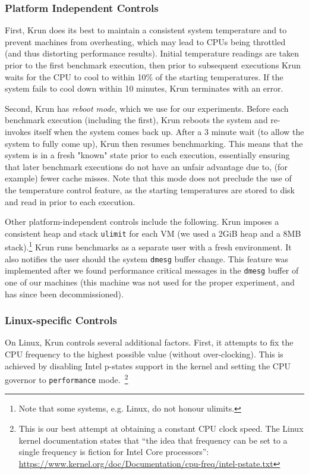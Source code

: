\documentclass[10pt,preprint]{sigplanconf}
\newcommand{\krun}{Krun\xspace}
\begin{document}
\subsubsection{Platform Independent Controls}

First, \krun does its best to maintain a consistent system temperature and to
prevent machines from overheating, which may lead to CPUs being throttled (and
thus distorting performance results). Initial temperature readings are taken
prior to the first benchmark execution, then prior to subsequent executions
\krun waits for the CPU to cool to within 10\%{} of the starting temperatures.
If the system fails to cool down within 10 minutes, \krun terminates with an
error.

Second, \krun has \emph{reboot mode}, which we use for our experiments. Before
each benchmark execution (including the first), \krun reboots the system and
re-invokes itself when the system comes back up. After a 3 minute wait (to
allow the system to fully come up), \krun then resumes benchmarking. This means
that the system is in a fresh "known" state prior to each execution,
essentially ensuring that later benchmark executions do not have an unfair
advantage due to, (for example) fewer cache misses. Note that this mode does
not preclude the use of the temperature control feature, as the starting
temperatures are stored to disk and read in prior to each execution.

Other platform-independent controls include the following. \krun imposes a
consistent heap and stack \texttt{ulimit} for each VM (we used a 2GiB heap and
a 8MB stack).\footnote{Note that some systems, e.g. Linux, do not honour
ulimits.} \krun runs benchmarks as a separate user with a fresh environment. It
also notifies the user should the system \texttt{dmesg} buffer
change. This feature was implemented after we found performance critical
messages in the \texttt{dmesg} buffer of one of our machines (this machine was
not used for the proper experiment, and has since been decommissioned).

\subsubsection{Linux-specific Controls}

On Linux, \krun controls several additional factors.
First, it attempts to fix the CPU frequency to the highest
possible value (without over-clocking). This is achieved by disabling Intel
p-states support in the kernel and setting the CPU governor to \texttt{performance}
mode.~\footnote{This is our best attempt at obtaining a constant CPU clock
speed. The Linux kernel documentation states that ``the idea that frequency can
be set to a single frequency is fiction for Intel Core
processors'':
\url{https://www.kernel.org/doc/Documentation/cpu-freq/intel-pstate.txt}}
\end{document}
